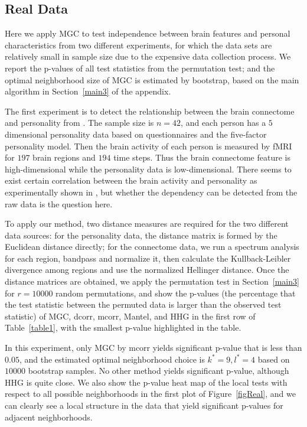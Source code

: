\documentclass[11pt]{article}
\begin{document}
\subsection{Real Data}
\label{numer3}
Here we apply MGC to test independence between brain features and personal characteristics from two different experiments, for which the data sets are relatively small in sample size due to the expensive data collection process. We report the p-values of all test statistics from the permutation test; and the optimal neighborhood size of MGC is estimated by bootstrap, based on the main algorithm in Section~\ref{main3} of the appendix.

The first experiment is to detect the relationship between the brain connectome and personality from \cite{AdelsteinEtAl2011}. The sample size is $n=42$, and each person has a $5$ dimensional personality data based on questionnaires and the five-factor personality model. Then the brain activity of each person is measured by fMRI for $197$ brain regions and $194$ time steps. Thus the brain connectome feature is high-dimensional while the personality data is low-dimensional. There seems to exist certain correlation between the brain activity and personality as experimentally shown in \cite{AdelsteinEtAl2011}, but whether the dependency can be detected from the raw data is the question here.

To apply our method, two distance measures are required for the two different data sources: for the personality data, the distance matrix is formed by the Euclidean distance directly; for the connectome data, we run a spectrum analysis for each region, bandpass and normalize it, then calculate the Kullback-Leibler divergence among regions and use the normalized Hellinger distance. Once the distance matrices are obtained, we apply the permutation test in Section~\ref{main3} for $r=10000$ random permutations, and show the p-values (the percentage that the test statistic between the permuted data is larger than the observed test statistic) of MGC, dcorr, mcorr, Mantel, and HHG in the first row of Table~\ref{table1}, with the smallest p-value highlighted in the table.

In this experiment, only MGC by mcorr yields significant p-value that is less than $0.05$, and the estimated optimal neighborhood choice is $k^{*}=9, l^{*}=4$ based on $10000$ bootstrap samples. No other method yields significant p-value, although HHG is quite close. We also show the p-value heat map of the local tests with respect to all possible neighborhoods in the first plot of Figure~\ref{figReal}, and we can clearly see a local structure in the data that yield significant p-values for adjacent neighborhoods.
\end{document}
